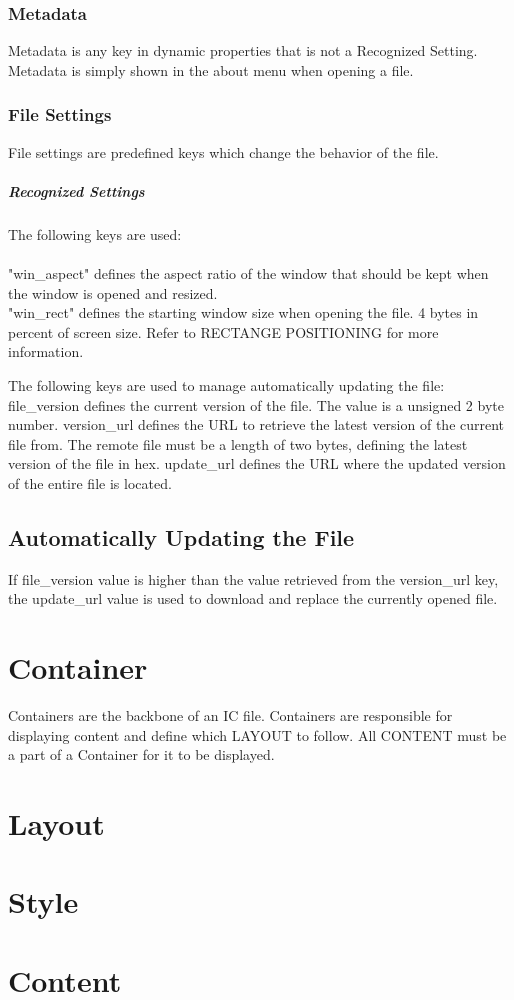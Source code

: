 \documentclass{report}
\begin{document}
\subsubsection{Metadata}
Metadata is any key in dynamic properties that is not a Recognized Setting. Metadata is simply shown in the about menu when opening a file.
\subsubsection{File Settings}
File settings are predefined keys which change the behavior of the file. 
\subparagraph{Recognized Settings}
The following keys are used:\\
\\
"win\_aspect" defines the aspect ratio of the window that should be kept when the window is opened and resized.\\
"win\_rect" defines the starting window size when opening the file. 4 bytes in percent of screen size. Refer to RECTANGE POSITIONING for more information.

The following keys are used to manage automatically updating the file:
file\_version defines the current version of the file. The value is a unsigned 2 byte number.
version\_url defines the URL to retrieve the latest version of the current file from. The remote file must be a length of two bytes, defining the latest version of the file in hex. 
update\_url defines the URL where the updated version of the entire file is located.


\subsection{Automatically Updating the File}
If file\_version value is higher than the value retrieved from the version\_url key, the update\_url value is used to download and replace the currently opened file.

\section{Container}
Containers are the backbone of an IC file. Containers are responsible for displaying content and define which LAYOUT to follow. All CONTENT must be a part of a Container for it to be displayed. 

\section{Layout}
\section{Style}
\section{Content}
\end{document}
